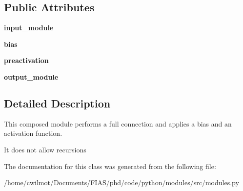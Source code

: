 \subsection*{Public Attributes}
\begin{DoxyCompactItemize}
\item 
\mbox{\label{classmodules_1_1_fully_connected_layer_module_a2fbb4bd59e3e033aa548fdcb7841a19a}} 
{\bfseries input\+\_\+module}
\item 
\mbox{\label{classmodules_1_1_fully_connected_layer_module_ac07d3608d761a0e7da5549323fbc54b5}} 
{\bfseries bias}
\item 
\mbox{\label{classmodules_1_1_fully_connected_layer_module_aa8edd562a443167aefb9be97539617c9}} 
{\bfseries preactivation}
\item 
\mbox{\label{classmodules_1_1_fully_connected_layer_module_ae69442247979be24dc1c8c3477ae821f}} 
{\bfseries output\+\_\+module}
\end{DoxyCompactItemize}


\subsection{Detailed Description}
This composed module performs a full connection and applies a bias and an activation function. 

It does not allow recursions 

The documentation for this class was generated from the following file\+:\begin{DoxyCompactItemize}
\item 
/home/cwilmot/\+Documents/\+F\+I\+A\+S/phd/code/python/modules/src/modules.\+py\end{DoxyCompactItemize}
